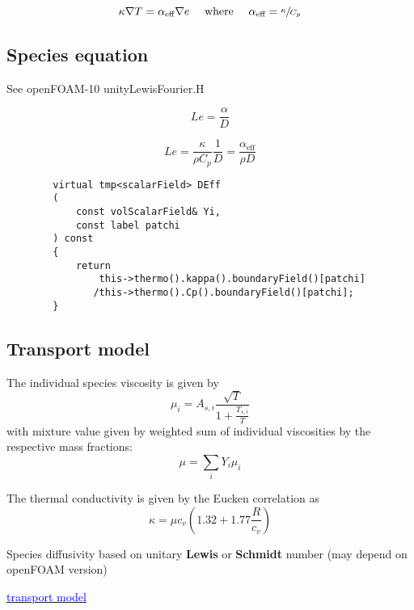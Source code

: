 \documentclass[a4paper, 12pt]{article}
\numberwithin{equation}{section}
\newcommand{\code}{\fontfamily{pcr}\selectfont}
\newcommand{\blue}[1]{\textcolor{blue}{#1}}
\begin{document}
        \begin{equation}
        \kappa \nabla T = \alpha_\text{eff} \nabla e \quad \text{ where } \quad  \alpha_\text{eff} = \sfrac{\kappa}{C_p}
        \end{equation}

    \subsection{Species equation}

        See openFOAM-10 {\code unityLewisFourier.H}

        \begin{equation}
        Le = \frac{\alpha}{D}
        \end{equation}

        \begin{equation}
        Le = \frac{\kappa}{\rho C_p} \frac{1}{D} = \frac{\alpha_\text{eff}}{\rho D}
        \end{equation}

    {
    \begin{verbatim}
        virtual tmp<scalarField> DEff
        (
            const volScalarField& Yi,
            const label patchi
        ) const
        {
            return
                this->thermo().kappa().boundaryField()[patchi]
               /this->thermo().Cp().boundaryField()[patchi];
        }
    \end{verbatim}
    }

    \subsection{Transport model}

        The individual species viscosity is given by
        \begin{equation}
            \mu_i = A_{s,i} \frac{\sqrt{T}}{1 + \frac{T_{s,i}}{T}}
        \end{equation}
        with mixture value given by weighted sum of individual viscosities by the respective mass fractions:
        \begin{equation}
            \mu = \sum_i Y_i \mu_i
        \end{equation}

        The thermal conductivity is given by the Eucken correlation as
        \begin{equation}
            \kappa = \mu c_v \left( 1.32 + 1.77 \frac{R}{c_v} \right)
        \end{equation}

        Species diffusivity based on unitary \textbf{Lewis} or \textbf{Schmidt} number (may depend on openFOAM version)

        \href{
        https://pure.tue.nl/ws/portalfiles/portal/305474394/1013373-Neural\_Network\_Hydrogen\_Combustion\_Modelling.pdf
        }{\blue{transport model}}
\end{document}
